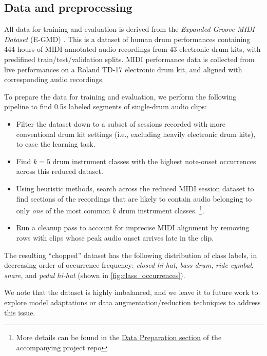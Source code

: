 \documentclass[twocolumn]{article}
\begin{document}
\subsection{Data and preprocessing}

All data for training and evaluation is derived from the \textit{Expanded Groove MIDI Dataset} (E-GMD) \cite{groove2020}.
This is a dataset of human drum performances containing 444 hours of MIDI-annotated audio recordings from 43 electronic drum kits, with predifined train/test/validation splits.
MIDI performance data is collected from live performances on a Roland TD-17 electronic drum kit, and aligned with corresponding audio recordings.

To prepare the data for training and evaluation, we perform the following pipeline to find 0.5s labeled segments of single-drum audio clips:
\begin{itemize}
\item Filter the dataset down to a subset of sessions recorded with more conventional drum kit settings (i.e., excluding heavily electronic drum kits), to ease the learning task.
\item Find $k=5$ drum instrument classes with the highest note-onset occurrences across this reduced dataset.
\item Using heuristic methods, search across the reduced MIDI session dataset to find sections of the recordings that are likely to contain audio belonging to only \textit{one} of the most common $k$ drum instrument classes. \footnote{More details can be found in the \href{https://github.com/khiner/DrumClassification\#prepare-data-for-training}{Data Preparation section} of the accompanying project repo}.
\item Run a cleanup pass to account for imprecise MIDI alignment by removing rows with clips whose peak audio onset arrives late in the clip.
\end{itemize}

The resulting ``chopped'' dataset has the following distribution of class labels, in decreasing order of occurrence frequency:
\textit{closed hi-hat}, \textit{bass drum}, \textit{ride cymbal}, \textit{snare}, and \textit{pedal hi-hat} (shown in \ref{fig:class_occurrences}).

We note that the dataset is highly imbalanced, and we leave it to future work to explore model adaptations or data augmentation/reduction techniques to address this issue.
\end{document}
